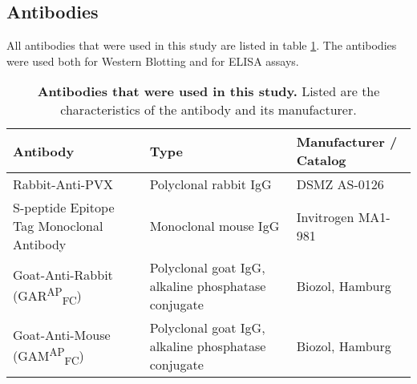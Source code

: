 \subsection{Antibodies}
All antibodies that were used in this study are listed in table \ref{tab:materials_antibodies}. The antibodies were used both for Western Blotting and for ELISA assays. 
\begin{table}[h]
    \centering
    \caption{\textbf{Antibodies that were used in this study.} Listed are the characteristics of the antibody and its manufacturer. }
    \begin{tabular}{lll}
    \toprule
    \textbf{Antibody} & \textbf{Type} & \textbf{Manufacturer / Catalog} \\
    \midrule
    Rabbit-Anti-PVX & Polyclonal rabbit IgG & DSMZ AS-0126 \\
    S-peptide Epitope Tag Monoclonal Antibody & Monoclonal mouse IgG & Invitrogen MA1-981 \\
    Goat-Anti-Rabbit (GAR\textsuperscript{AP}\textsubscript{FC}) & Polyclonal goat IgG, alkaline phosphatase conjugate & Biozol, Hamburg \\
    Goat-Anti-Mouse (GAM\textsuperscript{AP}\textsubscript{FC}) & Polyclonal goat IgG, alkaline phosphatase conjugate & Biozol, Hamburg \\
    \bottomrule
    \end{tabular}
    \label{tab:materials_antibodies}
\end{table}
\FloatBarrier
